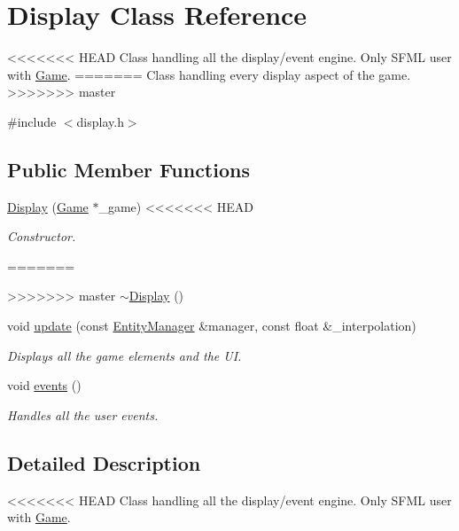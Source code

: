 \hypertarget{class_display}{\section{Display Class Reference}
\label{class_display}
}


<<<<<<< HEAD
Class handling all the display/event engine. Only S\-F\-M\-L user with \hyperlink{class_game}{Game}.  
=======
Class handling every display aspect of the game.  
>>>>>>> master




{\ttfamily \#include $<$display.\-h$>$}

\subsection*{Public Member Functions}
\begin{DoxyCompactItemize}
\item 
\hyperlink{class_display_a21052a50c5e922272d697aaf5cfb14cc}{Display} (\hyperlink{class_game}{Game} $\ast$\-\_\-game)
<<<<<<< HEAD
\begin{DoxyCompactList}\small\item\em Constructor. \end{DoxyCompactList}\item 
=======
\item 
>>>>>>> master
\hyperlink{class_display_ac2607a6bb236c55547a4223d40d85d1f}{$\sim$\-Display} ()
\item 
void \hyperlink{class_display_a713ee81045f32895c2b063037c81c388}{update} (const \hyperlink{class_entity_manager}{Entity\-Manager} \&manager, const float \&\-\_\-interpolation)
\begin{DoxyCompactList}\small\item\em Displays all the game elements and the U\-I. \end{DoxyCompactList}\item 
void \hyperlink{class_display_a05ee6cd33afcc51a5856148677a71c82}{events} ()
\begin{DoxyCompactList}\small\item\em Handles all the user events. \end{DoxyCompactList}\end{DoxyCompactItemize}


\subsection{Detailed Description}
<<<<<<< HEAD
Class handling all the display/event engine. Only S\-F\-M\-L user with \hyperlink{class_game}{Game}. 

